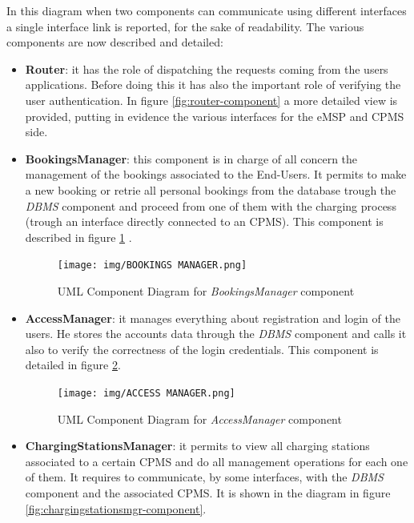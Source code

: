 \documentclass[a4paper]{report}
\begin{document}
In this diagram when two components can communicate using different interfaces a single interface link is
reported, for the sake of readability. The various components are now described and detailed:
\begin{itemize}
\item \textbf{Router}: it has the role of dispatching the requests coming from the users applications. Before doing this it has also the important role of verifying the user authentication. In figure \ref{fig:router-component} a more detailed view is provided, putting in evidence the various interfaces for the eMSP and CPMS side.

\item \textbf{BookingsManager}: this component is in charge of all concern the management of the bookings associated to the End-Users. It permits to make a new booking or retrie all personal bookings from the database trough the \textit{DBMS} component and proceed from one of them with the charging process (trough an interface directly connected to an CPMS). This component is described in figure \ref{fig:bookingsmgr-component} .


\begin{figure}[htp]
\texttt{[image: img/BOOKINGS MANAGER.png]}
\caption{UML Component Diagram for \textit{BookingsManager} component}
\label{fig:bookingsmgr-component}
\end{figure}

\item \textbf{AccessManager}: it manages everything about registration and login of the users. He stores the accounts data through the \textit{DBMS} component and calls it also to verify the correctness of the login credentials. This component is detailed in figure \ref{fig:accessmgr-component}.

\begin{figure}[htp]
\centering
\texttt{[image: img/ACCESS MANAGER.png]}
\caption{UML Component Diagram for \textit{AccessManager} component}
\label{fig:accessmgr-component}
\end{figure}

\item \textbf{ChargingStationsManager}: it permits to view all charging stations associated to a certain CPMS and do all management operations for each one of them. It requires to communicate, by some interfaces, with the \textit{DBMS} component and the associated CPMS. It is shown in the diagram in figure \ref{fig:chargingstationsmgr-component}.



\end{itemize}
\end{document}
